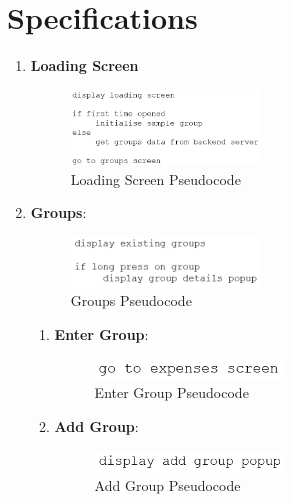 \documentclass[conference]{IEEEtran}
\begin{document}
\section{Specifications}
\begin{enumerate}
    \item \textbf {Loading Screen}
        \begin{figure}[h!]
            \centerline{\includegraphics[width=50mm,scale=0.5]{img/pseudocode/pseudocode-loading.png}}
            \caption{Loading Screen Pseudocode}
            \label{fig:my_label}
        \end{figure}
    \item \textbf {Groups}:
        \begin{figure}[h!]
            \centerline{\includegraphics[width=50mm,scale=0.5]{img/pseudocode/pseudocode-groups.png}}
            \caption{Groups Pseudocode}
            \label{fig:my_label}
        \end{figure}
        \begin{enumerate}
            \item \textbf{Enter Group}:
                \begin{figure}[h!]
                    \centerline{\includegraphics[width=50mm,scale=0.5]{img/pseudocode/pseudocode-enter_group.png}}
                    \caption{Enter Group Pseudocode}
                    \label{fig:my_label}
                \end{figure}
            \item \textbf {Add Group}:
                \begin{figure}[h!]
                    \centerline{\includegraphics[width=50mm,scale=0.5]{img/pseudocode/pseudocode-add_group.png}}
                    \caption{Add Group Pseudocode}
                    \label{fig:my_label}
                \end{figure}

\end{enumerate}
\end{enumerate}
\end{document}
